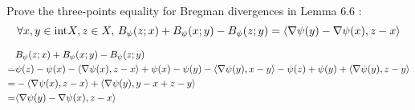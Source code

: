 \begin{exercise}[]{}
	Prove the three-points equality for Bregman divergences in Lemma 6.6 :
\begin{equation*}
	\forall x,y \in \text{int} X, z \in X, \, B_{\psi}(z ; x) + B_{\psi}(x ; y) - B_{\psi}(z ; y) = \langle\nabla \psi(y)-\nabla \psi(x),z-x\rangle
\end{equation*}

\end{exercise}

\begin{solution}[]
\begin{align*}
	&B_{\psi}(z ; x) + B_{\psi}(x ;y) - B_{\psi}(z ;y) \\
	=& \psi(z)-\psi(x) - \langle\nabla \psi(x),z-x\rangle + \psi(x) - \psi(y) - \langle\nabla  \psi(y),x-y\rangle -\psi(z) + \psi(y) + \langle\nabla \psi(y),z-y\rangle \\
	=& -\langle\nabla \psi(x),z-x\rangle + \langle\nabla \psi(y),y-x + z-y\rangle \\
	=& \langle\nabla \psi(y) - \nabla \psi(x),z-x\rangle
\end{align*}

\end{solution}
